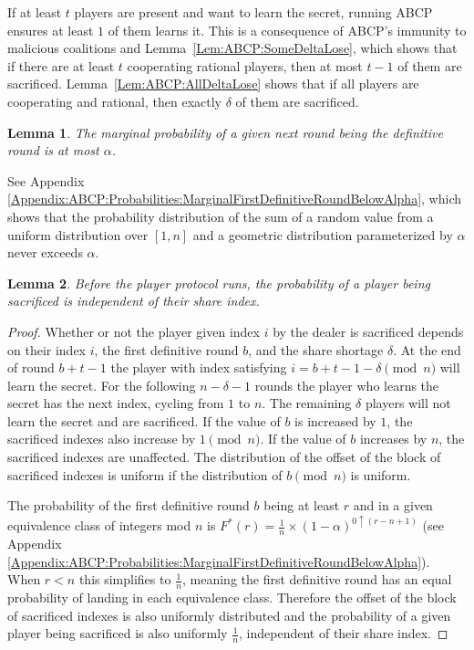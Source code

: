 \documentclass[12pt]{dalcsthesis}
\newtheorem{lemma}{Lemma}
\begin{document}
If at least $t$ players are present and want to learn the secret, running ABCP ensures at least $1$ of them learns it. This is a consequence of ABCP's immunity to malicious coalitions and Lemma~\ref{Lem:ABCP:SomeDeltaLose}, which shows that if there are at least $t$ cooperating rational players, then at most $t-1$ of them are sacrificed. Lemma~\ref{Lem:ABCP:AllDeltaLose} shows that if all players are cooperating and rational, then exactly $\delta$ of them are sacrificed.

\begin{lemma}\label{Lem:ABPC:MarginalAtMostAlpha}The marginal probability of a given next round being the definitive round is at most $\alpha$.\end{lemma}
See Appendix \ref{Appendix:ABCP:Probabilities:MarginalFirstDefinitiveRoundBelowAlpha}, which shows that the probability distribution of the sum of a random value from a uniform distribution over $[1,n]$ and a geometric distribution parameterized by $\alpha$ never exceeds $\alpha$.

\begin{lemma}\label{Lem:ABCP:FairSacrificeBefore}Before the player protocol runs, the probability of a player being sacrificed is independent of their share index.\end{lemma}
\begin{proof}
Whether or not the player given index $i$ by the dealer is sacrificed depends on their index $i$, the first definitive round $b$, and the share shortage $\delta$. At the end of round $b+t-1$ the player with index satisfying $i = b+t-1-\delta \pmod{n}$ will learn the secret. For the following $n-\delta-1$ rounds the player who learns the secret has the next index, cycling from $1$ to $n$. The remaining $\delta$ players will not learn the secret and are sacrificed. If the value of $b$ is increased by $1$, the sacrificed indexes also increase by $1 \pmod{n}$. If the value of $b$ increases by $n$, the sacrificed indexes are unaffected. The distribution of the offset of the block of sacrificed indexes is uniform if the distribution of $b \pmod{n}$ is uniform.

The probability of the first definitive round $b$ being at least $r$ and in a given equivalence class of integers mod $n$ is $F^{*}(r) = \frac{1}{n} \times (1-\alpha)^{0 \uparrow (r - n + 1)}$ (see Appendix \ref{Appendix:ABCP:Probabilities:MarginalFirstDefinitiveRoundBelowAlpha}). When $r < n$ this simplifies to $\frac{1}{n}$, meaning the first definitive round has an equal probability of landing in each equivalence class. Therefore the offset of the block of sacrificed indexes is also uniformly distributed and the probability of a given player being sacrificed is also uniformly $\frac{1}{n}$, independent of their share index.
\end{proof}
\end{document}
